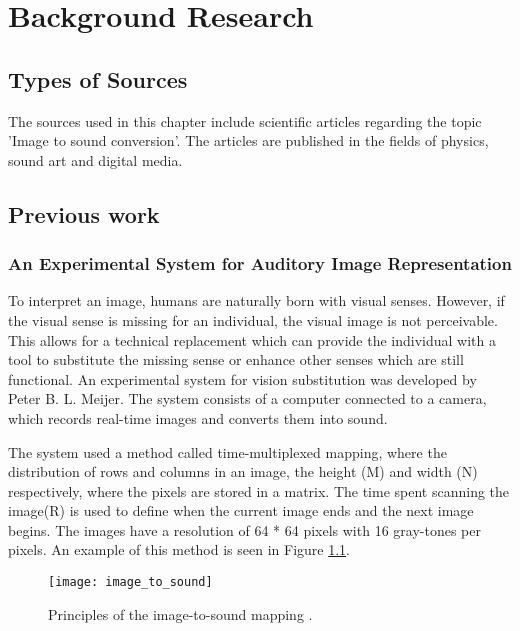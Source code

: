 \chapter{Background Research}\label{ch:bgresearch}

\section{Types of Sources}\label{sec:typesofsources} 
The sources used in this chapter include scientific articles regarding the topic 'Image to sound conversion'. The articles are published in the fields of physics, sound art and digital media.

\section{Previous work}\label{sec:previouswork}

\subsection{An Experimental System for Auditory Image Representation}\label{sec:experimentalsystem}

To interpret an image, humans are naturally born with visual senses. However, if the visual sense is missing for an individual, the visual image is not perceivable. This allows for a technical replacement which can provide the individual with a tool to substitute the missing sense or enhance other senses which are still functional. An experimental system for vision substitution was developed by Peter B. L. Meijer\cite{Meijer1992}. The system consists of a computer connected to a camera, which records real-time images and converts them into sound. 

The system used a method called time-multiplexed mapping, where the distribution of rows and columns in an image, the height (M) and width (N) respectively, where the pixels are stored in a matrix. The time spent scanning the image(R) is used to define when the current image ends and the next image begins. The images have a resolution of 64 * 64 pixels with 16 gray-tones per pixels. An example of this method is seen in Figure \ref{fig:image_to_sound}. 

\begin{figure}[!h] 
\centering
\texttt{[image: image\_to\_sound]}
\caption{\label{fig:image_to_sound} Principles of the image-to-sound mapping \cite{Meijer1992}.}
\end{figure}
  
